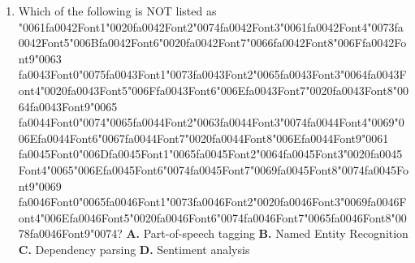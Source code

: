 \documentclass[11pt]{article}
\begin{document}
\begin{enumerate}[leftmargin=*]
  \item Which of the following is NOT listed as {\char"0061}{\csname fa0042Font1\endcsname\char"0020}{\csname fa0042Font2\endcsname\char"0074}{\csname fa0042Font3\endcsname\char"0061}{\csname fa0042Font4\endcsname\char"0073}{\csname fa0042Font5\endcsname\char"006B}{\csname fa0042Font6\endcsname\char"0020}{\csname fa0042Font7\endcsname\char"0066}{\csname fa0042Font8\endcsname\char"006F}{\csname fa0042Font9\endcsname\char"0063} {\csname fa0043Font0\endcsname\char"0075}{\csname fa0043Font1\endcsname\char"0073}{\csname fa0043Font2\endcsname\char"0065}{\csname fa0043Font3\endcsname\char"0064}{\csname fa0043Font4\endcsname\char"0020}{\csname fa0043Font5\endcsname\char"006F}{\csname fa0043Font6\endcsname\char"006E}{\csname fa0043Font7\endcsname\char"0020}{\csname fa0043Font8\endcsname\char"0064}{\csname fa0043Font9\endcsname\char"0065} {\csname fa0044Font0\endcsname\char"0074}{\char"0065}{\csname fa0044Font2\endcsname\char"0063}{\csname fa0044Font3\endcsname\char"0074}{\csname fa0044Font4\endcsname\char"0069}{\char"006E}{\csname fa0044Font6\endcsname\char"0067}{\csname fa0044Font7\endcsname\char"0020}{\csname fa0044Font8\endcsname\char"006E}{\csname fa0044Font9\endcsname\char"0061} {\csname fa0045Font0\endcsname\char"006D}{\csname fa0045Font1\endcsname\char"0065}{\csname fa0045Font2\endcsname\char"0064}{\csname fa0045Font3\endcsname\char"0020}{\csname fa0045Font4\endcsname\char"0065}{\char"006E}{\csname fa0045Font6\endcsname\char"0074}{\csname fa0045Font7\endcsname\char"0069}{\csname fa0045Font8\endcsname\char"0074}{\csname fa0045Font9\endcsname\char"0069} {\csname fa0046Font0\endcsname\char"0065}{\csname fa0046Font1\endcsname\char"0073}{\csname fa0046Font2\endcsname\char"0020}{\csname fa0046Font3\endcsname\char"0069}{\csname fa0046Font4\endcsname\char"006E}{\csname fa0046Font5\endcsname\char"0020}{\csname fa0046Font6\endcsname\char"0074}{\csname fa0046Font7\endcsname\char"0065}{\csname fa0046Font8\endcsname\char"0078}{\csname fa0046Font9\endcsname\char"0074}?
    \textbf{A.} Part-of-speech tagging
    \textbf{B.} Named Entity Recognition
    \textbf{C.} Dependency parsing
    \textbf{D.} Sentiment analysis


\end{enumerate}
\end{document}

